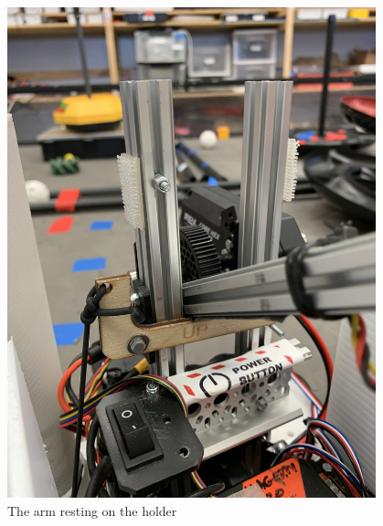 \begin{figure}[ht]
\begin{minipage}[b]{.48\textwidth}
  \includegraphics[width=0.95\textwidth]{Meetings/November/11-08-21/11-8-21_Hardware_Figure2 - Nathan Forrer.JPG}
  \caption{The arm resting on the holder}
  \label{fig:pic2}
\end{minipage}
\end{figure}

